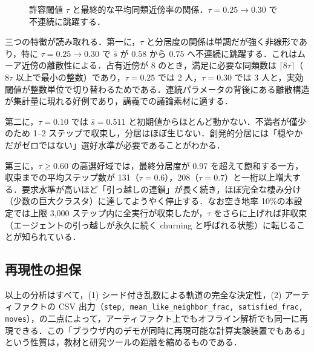 \documentclass[a4paper]{jlreq}
\begin{document}
\begin{figure}[tbp]
\centering
{}
\caption{許容閾値 $\tau$ と最終的な平均同類近傍率の関係．$\tau=0.25 \to 0.30$ で不連続に跳躍する．}
\label{fig:sweep}
\end{figure}

三つの特徴が読み取れる．第一に，$\tau$ と分居度の関係は単調だが強く非線形であり，特に $\tau = 0.25 \to 0.30$ で $\bar{s}$ が $0.58$ から $0.75$ へ不連続に跳躍する．これはムーア近傍の離散性による．占有近傍が 8 のとき，満足に必要な同類数は $\lceil 8\tau \rceil$（$8\tau$ 以上で最小の整数）であり，$\tau=0.25$ では 2 人，$\tau=0.30$ では 3 人と，実効閾値が整数単位で切り替わるためである．連続パラメータの背後にある離散構造が集計量に現れる好例であり，講義での議論素材に適する．

第二に，$\tau=0.10$ では $\bar{s} = 0.511$ と初期値からほとんど動かない．不満者が僅少のため 1--2 ステップで収束し，分居はほぼ生じない．創発的分居には「穏やかだがゼロではない」選好水準が必要であることがわかる．

第三に，$\tau \ge 0.60$ の高選好域では，最終分居度が 0.97 を超えて飽和する一方，収束までの平均ステップ数が 131（$\tau=0.6$），208（$\tau=0.7$）と一桁以上増大する．要求水準が高いほど「引っ越しの連鎖」が長く続き，ほぼ完全な棲み分け（少数の巨大クラスタ）に達してようやく停止する．なお空き地率 10\%の本設定では上限 3{,}000 ステップ内に全実行が収束したが，$\tau$ をさらに上げれば非収束（エージェントの引っ越しが永久に続く churning と呼ばれる状態）に転じることが知られている．

\subsection{再現性の担保}

以上の分析はすべて，(1) シード付き乱数による軌道の完全な決定性，(2) アーティファクトの CSV 出力（\texttt{step, mean\_like\_neighbor\_frac, satisfied\_frac, moves}），の二点によって，アーティファクト上でもオフライン解析でも同一に再現できる．この「ブラウザ内のデモが同時に再現可能な計算実験装置でもある」という性質は，教材と研究ツールの距離を縮めるものである．
\end{document}
